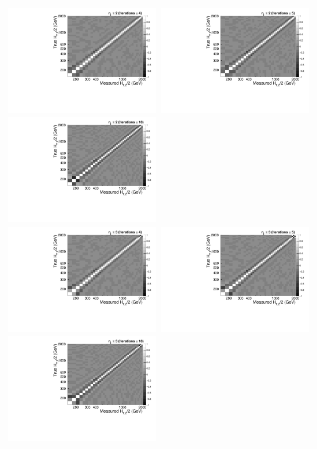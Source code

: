 \begin{figure}[!htbp]
  \begin{center}
    \includegraphics[width=0.35\textwidth]{Plots_HT_2_150/Correlation_Matrix_NLO_2_ite4.pdf}%
    \includegraphics[width=0.35\textwidth]{Plots_HT_2_150/Correlation_Matrix_NLO_2_ite5.pdf}%
    \includegraphics[width=0.35\textwidth]{Plots_HT_2_150/Correlation_Matrix_NLO_2_ite10.pdf}\\
    \vspace{5mm}
    \includegraphics[width=0.35\textwidth]{Plots_HT_2_150/Correlation_Matrix_NLO_3_ite4.pdf}%
    \includegraphics[width=0.35\textwidth]{Plots_HT_2_150/Correlation_Matrix_NLO_3_ite5.pdf}%
    \includegraphics[width=0.35\textwidth]{Plots_HT_2_150/Correlation_Matrix_NLO_3_ite10.pdf}%

\end{center}
\end{figure}
